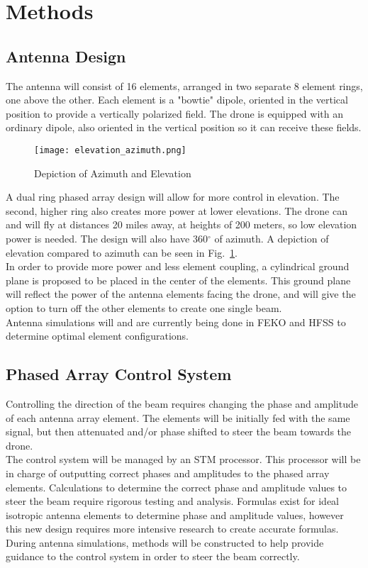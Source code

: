 \documentclass[UROP.tex]{subfiles}
\begin{document}
\bigskip
\section{\Large Methods}
\subsection{Antenna Design}
	The antenna will consist of 16 elements, arranged in two separate 8 element rings, one above the other.  Each element is a "bowtie" dipole, oriented in the vertical position to provide a vertically polarized field.  The drone is equipped with an ordinary dipole, also oriented in the vertical position so it can receive these fields.  
	
	\begin{figure}[H]
		\centering
		\texttt{[image: elevation\_azimuth.png]}
		\caption{ Depiction of Azimuth and Elevation \label{fig:elevation_azimuth}}
	\end{figure}
	
	A dual ring phased array design will allow for more control in elevation.  The second, higher ring also creates more power at lower elevations.  The drone can and will fly at distances 20 miles away, at heights of 200 meters, so low elevation power is needed.  The design will also have 360$^{\circ}$ of azimuth.  A depiction of elevation compared to azimuth can be seen in Fig.~\ref{fig:elevation_azimuth}. \\
	
	In order to provide more power and less element coupling, a cylindrical ground plane is proposed to be placed in the center of the elements. This ground plane will reflect the power of the antenna elements facing the drone, and will give the option to turn off the other elements to create one single beam.\\
	
	Antenna simulations will and are currently being done in FEKO and HFSS to determine optimal element configurations.
\subsection{Phased Array Control System}
	Controlling the direction of the beam requires changing the phase and amplitude of each antenna array element.  The elements will be initially fed with the same signal, but then attenuated and/or phase shifted to steer the beam towards the drone.  \\
	
	The control system will be managed by an STM processor.  This processor will be in charge of outputting correct phases and amplitudes to the phased array elements.  Calculations to determine the correct phase and amplitude values to steer the beam require rigorous testing and analysis.  Formulas exist for ideal isotropic antenna elements to determine phase and amplitude values, however this new design requires more intensive research to create accurate formulas.  During antenna simulations, methods will be constructed to help provide guidance to the control system in order to steer the beam correctly. \\
	
\end{document}
